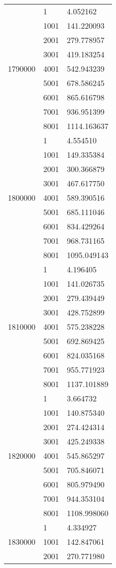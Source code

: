 \begin{table}[htb!]
\begin{tabular}{lll}
\multirow[c]{9}{*}{1790000} & 1 & 4.052162 \\
 & 1001 & 141.220093 \\
 & 2001 & 279.778957 \\
 & 3001 & 419.183254 \\
 & 4001 & 542.943239 \\
 & 5001 & 678.586245 \\
 & 6001 & 865.616798 \\
 & 7001 & 936.951399 \\
 & 8001 & 1114.163637 \\
\multirow[c]{9}{*}{1800000} & 1 & 4.554510 \\
 & 1001 & 149.335384 \\
 & 2001 & 300.366879 \\
 & 3001 & 467.617750 \\
 & 4001 & 589.390516 \\
 & 5001 & 685.111046 \\
 & 6001 & 834.429264 \\
 & 7001 & 968.731165 \\
 & 8001 & 1095.049143 \\
\multirow[c]{9}{*}{1810000} & 1 & 4.196405 \\
 & 1001 & 141.026735 \\
 & 2001 & 279.439449 \\
 & 3001 & 428.752899 \\
 & 4001 & 575.238228 \\
 & 5001 & 692.869425 \\
 & 6001 & 824.035168 \\
 & 7001 & 955.771923 \\
 & 8001 & 1137.101889 \\
\multirow[c]{9}{*}{1820000} & 1 & 3.664732 \\
 & 1001 & 140.875340 \\
 & 2001 & 274.424314 \\
 & 3001 & 425.249338 \\
 & 4001 & 545.865297 \\
 & 5001 & 705.846071 \\
 & 6001 & 805.979490 \\
 & 7001 & 944.353104 \\
 & 8001 & 1108.998060 \\
\multirow[c]{9}{*}{1830000} & 1 & 4.334927 \\
 & 1001 & 142.847061 \\
 & 2001 & 270.771980 \\

\end{tabular}
\end{table}
